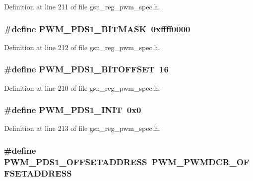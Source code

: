 Definition at line 211 of file gsn\_\-reg\_\-pwm\_\-spec.h.

\hypertarget{a00565_ab1f290fb10c11f76a50cae8de640ff6d}{
\subsubsection[{PWM\_\-PDS1\_\-BITMASK}]{\setlength{\rightskip}{0pt plus 5cm}\#define PWM\_\-PDS1\_\-BITMASK~0xffff0000}}
\label{a00565_ab1f290fb10c11f76a50cae8de640ff6d}


Definition at line 212 of file gsn\_\-reg\_\-pwm\_\-spec.h.

\hypertarget{a00565_a003f5d5b2ba862041386fc85e91b535d}{
\subsubsection[{PWM\_\-PDS1\_\-BITOFFSET}]{\setlength{\rightskip}{0pt plus 5cm}\#define PWM\_\-PDS1\_\-BITOFFSET~16}}
\label{a00565_a003f5d5b2ba862041386fc85e91b535d}


Definition at line 210 of file gsn\_\-reg\_\-pwm\_\-spec.h.

\hypertarget{a00565_ad27640307879d938cddb8c4b120cbcaa}{
\subsubsection[{PWM\_\-PDS1\_\-INIT}]{\setlength{\rightskip}{0pt plus 5cm}\#define PWM\_\-PDS1\_\-INIT~0x0}}
\label{a00565_ad27640307879d938cddb8c4b120cbcaa}


Definition at line 213 of file gsn\_\-reg\_\-pwm\_\-spec.h.

\hypertarget{a00565_aedcb01b681b85e2b4b769edc20acc37f}{
\subsubsection[{PWM\_\-PDS1\_\-OFFSETADDRESS}]{\setlength{\rightskip}{0pt plus 5cm}\#define PWM\_\-PDS1\_\-OFFSETADDRESS~PWM\_\-PWMDCR\_\-OFFSETADDRESS}}
\label{a00565_aedcb01b681b85e2b4b769edc20acc37f}


